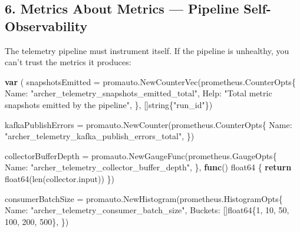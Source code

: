 \documentclass[
]{article}
\newenvironment{Shaded}{}{}
\newcommand{\BuiltInTok}[1]{\textcolor[rgb]{0.00,0.50,0.00}{#1}}
\newcommand{\ControlFlowTok}[1]{\textcolor[rgb]{0.00,0.44,0.13}{\textbf{#1}}}
\newcommand{\DataTypeTok}[1]{\textcolor[rgb]{0.56,0.13,0.00}{#1}}
\newcommand{\DecValTok}[1]{\textcolor[rgb]{0.25,0.63,0.44}{#1}}
\newcommand{\KeywordTok}[1]{\textcolor[rgb]{0.00,0.44,0.13}{\textbf{#1}}}
\newcommand{\NormalTok}[1]{#1}
\newcommand{\OperatorTok}[1]{\textcolor[rgb]{0.40,0.40,0.40}{#1}}
\newcommand{\StringTok}[1]{\textcolor[rgb]{0.25,0.44,0.63}{#1}}
\begin{document}
\hypertarget{metrics-about-metrics-pipeline-self-observability}{%
\subsection{6. Metrics About Metrics --- Pipeline
Self-Observability}\label{metrics-about-metrics-pipeline-self-observability}}

The telemetry pipeline must instrument itself. If the pipeline is
unhealthy, you can't trust the metrics it produces:

\begin{Shaded}
\begin{Highlighting}[]
\KeywordTok{var} \OperatorTok{(}
\NormalTok{    snapshotsEmitted }\OperatorTok{=}\NormalTok{ promauto}\OperatorTok{.}\NormalTok{NewCounterVec}\OperatorTok{(}\NormalTok{prometheus}\OperatorTok{.}\NormalTok{CounterOpts}\OperatorTok{\{}
\NormalTok{        Name}\OperatorTok{:} \StringTok{"archer\_telemetry\_snapshots\_emitted\_total"}\OperatorTok{,}
\NormalTok{        Help}\OperatorTok{:} \StringTok{"Total metric snapshots emitted by the pipeline"}\OperatorTok{,}
    \OperatorTok{\},} \OperatorTok{[]}\DataTypeTok{string}\OperatorTok{\{}\StringTok{"run\_id"}\OperatorTok{\})}

\NormalTok{    kafkaPublishErrors }\OperatorTok{=}\NormalTok{ promauto}\OperatorTok{.}\NormalTok{NewCounter}\OperatorTok{(}\NormalTok{prometheus}\OperatorTok{.}\NormalTok{CounterOpts}\OperatorTok{\{}
\NormalTok{        Name}\OperatorTok{:} \StringTok{"archer\_telemetry\_kafka\_publish\_errors\_total"}\OperatorTok{,}
    \OperatorTok{\})}

\NormalTok{    collectorBufferDepth }\OperatorTok{=}\NormalTok{ promauto}\OperatorTok{.}\NormalTok{NewGaugeFunc}\OperatorTok{(}\NormalTok{prometheus}\OperatorTok{.}\NormalTok{GaugeOpts}\OperatorTok{\{}
\NormalTok{        Name}\OperatorTok{:} \StringTok{"archer\_telemetry\_collector\_buffer\_depth"}\OperatorTok{,}
    \OperatorTok{\},} \KeywordTok{func}\OperatorTok{()} \DataTypeTok{float64} \OperatorTok{\{} \ControlFlowTok{return} \DataTypeTok{float64}\OperatorTok{(}\BuiltInTok{len}\OperatorTok{(}\NormalTok{collector}\OperatorTok{.}\NormalTok{input}\OperatorTok{))} \OperatorTok{\})}

\NormalTok{    consumerBatchSize }\OperatorTok{=}\NormalTok{ promauto}\OperatorTok{.}\NormalTok{NewHistogram}\OperatorTok{(}\NormalTok{prometheus}\OperatorTok{.}\NormalTok{HistogramOpts}\OperatorTok{\{}
\NormalTok{        Name}\OperatorTok{:}    \StringTok{"archer\_telemetry\_consumer\_batch\_size"}\OperatorTok{,}
\NormalTok{        Buckets}\OperatorTok{:} \OperatorTok{[]}\DataTypeTok{float64}\OperatorTok{\{}\DecValTok{1}\OperatorTok{,} \DecValTok{10}\OperatorTok{,} \DecValTok{50}\OperatorTok{,} \DecValTok{100}\OperatorTok{,} \DecValTok{200}\OperatorTok{,} \DecValTok{500}\OperatorTok{\},}
    \OperatorTok{\})}


\end{Highlighting}
\end{Shaded}
\end{document}
